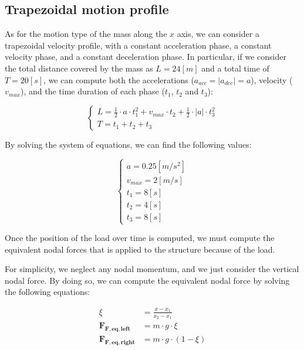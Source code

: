 \subsection{Trapezoidal motion profile}
\label{subsec:trapezoidal_motion_profile}

As for the motion type of the mass along the $x$ axis, we can consider a trapezoidal velocity profile, with a constant acceleration phase, a constant velocity phase, and a constant deceleration phase.
In particular, if we consider the total distance covered by the mass as $L = 24[m]$ and a total time of $T = 20[s]$, we can compute both the accelerations ($a_{acc} = |a_{dec}| = a$), velocity ($v_{max}$), and the time duration of each phase ($t_1$, $t_2$ and $t_3$):

\begin{equation}
    \begin{cases}
        L = \frac{1}{2} \cdot a \cdot t_1^2 + v_{max} \cdot t_2 + \frac{1}{2} \cdot |a| \cdot t_3^2 \\
        T = t_1 + t_2 + t_3
    \end{cases}
\end{equation}

By solving the system of equations, we can find the following values:

\begin{equation}
    \begin{cases}
        a = 0.25 [m/s^2]  \\
        v_{max} = 2 [m/s] \\
        t_1 = 8 [s]       \\
        t_2 = 4 [s]       \\
        t_3 = 8 [s]
    \end{cases}
\end{equation}

Once the position of the load over time is computed, we must compute the equivalent nodal forces that is applied to the structure because of the load.

For simplicity, we neglect any nodal momentum, and we just consider the vertical nodal force.
By doing so, we can compute the equivalent nodal force by solving the following equations:

\begin{align}
    \xi           & = \frac{x - x_1}{x_2 - x_1} \\
    \mathbf{F_{F, eq, left}}  & = m \cdot g \cdot \xi       \\
    \mathbf{F_{F, eq, right}} & = m \cdot g \cdot (1 - \xi)
    \label{eq:equivalent_nodal_force}
\end{align}

